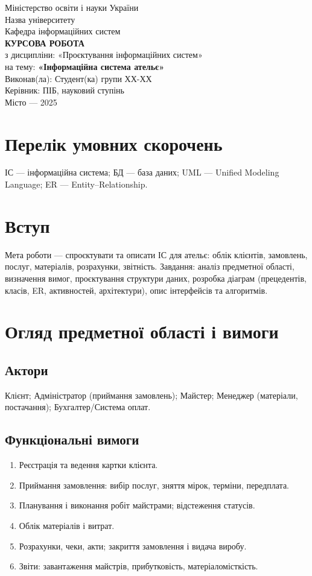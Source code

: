 \documentclass[14pt,a4paper]{extarticle}
\begin{document}
\begin{titlepage}
  \centering
  \large
  Міністерство освіти і науки України\\
  [1ex]
  Назва університету\\
  Кафедра інформаційних систем\\[12ex]
  \textbf{КУРСОВА РОБОТА}\\[1ex]
  з дисципліни: «Проєктування інформаційних систем»\\[1ex]
  на тему: \textbf{«Інформаційна система ательє»}\\[12ex]
  Виконав(ла): Студент(ка) групи ХХ-ХХ\\
  Керівник: ПІБ, науковий ступінь\\[10ex]
  Місто — 2025
\end{titlepage}

\tableofcontents
\newpage

\section*{Перелік умовних скорочень}
ІС — інформаційна система; БД — база даних; UML — Unified Modeling Language; ER — Entity–Relationship.

\section{Вступ}
Мета роботи — спроєктувати та описати ІС для ательє: облік клієнтів, замовлень, послуг, матеріалів, розрахунки, звітність. Завдання: аналіз предметної області, визначення вимог, проєктування структури даних, розробка діаграм (прецедентів, класів, ER, активностей, архітектури), опис інтерфейсів та алгоритмів.

\section{Огляд предметної області і вимоги}
\subsection{Актори}
Клієнт; Адміністратор (приймання замовлень); Майстер; Менеджер (матеріали, постачання); Бухгалтер/Система оплат.
\subsection{Функціональні вимоги}
\begin{enumerate}[label=F\arabic*.]
  \item Реєстрація та ведення картки клієнта.
  \item Приймання замовлення: вибір послуг, зняття мірок, терміни, передплата.
  \item Планування і виконання робіт майстрами; відстеження статусів.
  \item Облік матеріалів і витрат.
  \item Розрахунки, чеки, акти; закриття замовлення і видача виробу.
  \item Звіти: завантаження майстрів, прибутковість, матеріаломісткість.
\end{enumerate}
\end{document}
